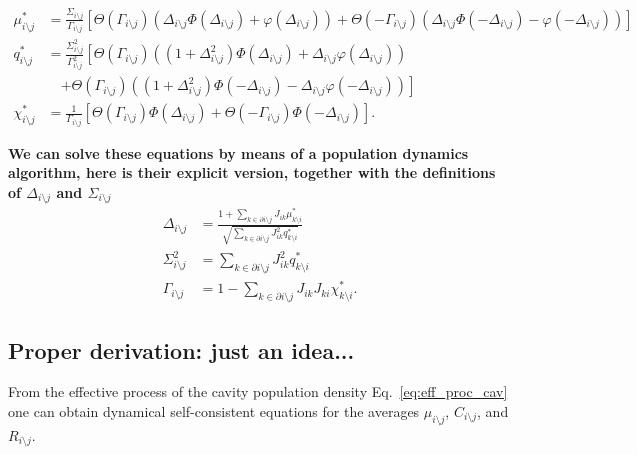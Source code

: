 \documentclass[
    preprint,
    linenumbers,
    amsmath,amssymb,amsfonts,
    aps, physrev,
    superscriptaddress,
    10pt,
    bibnotes
    ]{revtex4-2}
\begin{document}
\begin{subequations}
\begin{align}
\mu_{i\setminus j}^*&=\frac{\Sigma_{i\setminus j}}{\Gamma_{i\setminus j}}\left[\Theta(\Gamma_{i\setminus j})\left(\Delta_{i\setminus j}\Phi(\Delta_{i\setminus j})+\varphi(\Delta_{i\setminus j}) \right)+\Theta(-\Gamma_{i\setminus j}) \left(\Delta_{i\setminus j}\Phi(-\Delta_{i\setminus j})-\varphi(-\Delta_{i\setminus j}) \right)\right]\\
q_{i\setminus j}^*&=\frac{\Sigma^2_{i\setminus j}}{\Gamma^2_{i\setminus j}}\left[\Theta(\Gamma_{i\setminus j})\left(\left(1+\Delta_{i\setminus j}^2\right)\Phi(\Delta_{i\setminus j})+\Delta_{i\setminus j}\varphi(\Delta_{i\setminus j})\right)\right.\nonumber\\
&\quad \left.+\Theta(\Gamma_{i\setminus j})\left(\left(1+\Delta_{i\setminus j}^2\right)\Phi(-\Delta_{i\setminus j})-\Delta_{i\setminus j}\varphi(-\Delta_{i\setminus j})\right)  \right]\\
\chi_{i\setminus j}^*&=\frac{1}{\Gamma_{i\setminus j}}\left[\Theta(\Gamma_{i\setminus j})\Phi(\Delta_{i\setminus j})+\Theta(-\Gamma_{i\setminus j})\Phi(-\Delta_{i\setminus j})\right].
\end{align}
\end{subequations}

{\bf We can solve these equations by means of a population dynamics algorithm, here is their explicit version, together with the definitions of $\Delta_{i\setminus j}$ and $\Sigma_{i\setminus j}$
\begin{subequations}
\begin{align}
\Delta_{i\setminus j}&=\frac{1+\sum_{k\in \partial i\setminus j}J_{ik}\mu_{k\setminus i}^*}{\sqrt{\sum_{k\in \partial i\setminus j}J_{ik}^2 q_{k\setminus i}^*}}\\
\Sigma_{i\setminus j}^2&=\sum_{k\in \partial i\setminus j}J_{ik}^2 q_{k\setminus i}^*\\
\Gamma_{i\setminus j}&=1-\sum_{k\in\partial i \setminus j}J_{ik}J_{ki}\chi_{k \setminus i}^{*}.
\end{align}
\end{subequations}
}


\subsection{Proper derivation: just an idea...}

From the effective process of the cavity population density Eq.~\eqref{eq:eff_proc_cav}
one can obtain dynamical self-consistent equations for the averages
$\mu_{i\setminus j}$, $C_{i\setminus j}$, and $R_{i\setminus j}$.
\end{document}
